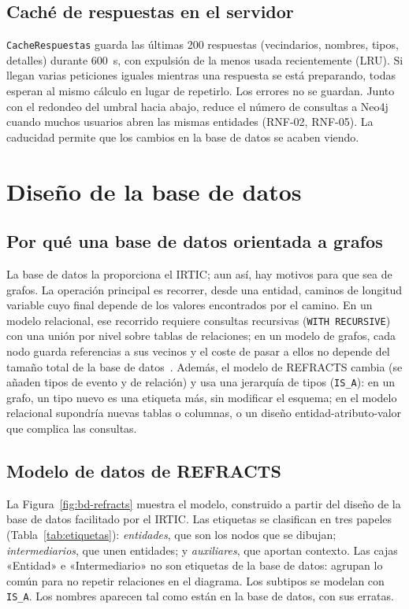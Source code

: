 \subsection{Caché de respuestas en el servidor}
\label{sec:alg-cache}

\texttt{CacheRespuestas} guarda las últimas 200 respuestas (vecindarios, nombres, tipos, detalles) durante 600~s, con expulsión de la menos usada recientemente (LRU). Si llegan varias peticiones iguales mientras una respuesta se está preparando, todas esperan al mismo cálculo en lugar de repetirlo. Los errores no se guardan. Junto con el redondeo del umbral hacia abajo, reduce el número de consultas a Neo4j cuando muchos usuarios abren las mismas entidades (RNF-02, RNF-05). La caducidad permite que los cambios en la base de datos se acaben viendo.

\section{Diseño de la base de datos}
\label{sec:bd}

\subsection{Por qué una base de datos orientada a grafos}

La base de datos la proporciona el IRTIC; aun así, hay motivos para que sea de grafos. La operación principal es recorrer, desde una entidad, caminos de longitud variable cuyo final depende de los valores encontrados por el camino. En un modelo relacional, ese recorrido requiere consultas recursivas (\texttt{WITH RECURSIVE}) con una unión por nivel sobre tablas de relaciones; en un modelo de grafos, cada nodo guarda referencias a sus vecinos y el coste de pasar a ellos no depende del tamaño total de la base de datos~\cite{robinson2015}. Además, el modelo de REFRACTS cambia (se añaden tipos de evento y de relación) y usa una jerarquía de tipos (\texttt{IS\_A}): en un grafo, un tipo nuevo es una etiqueta más, sin modificar el esquema; en el modelo relacional supondría nuevas tablas o columnas, o un diseño entidad-atributo-valor que complica las consultas.

\subsection{Modelo de datos de REFRACTS}

La Figura~\ref{fig:bd-refracts} muestra el modelo, construido a partir del diseño de la base de datos facilitado por el IRTIC. Las etiquetas se clasifican en tres papeles (Tabla~\ref{tab:etiquetas}): \emph{entidades}, que son los nodos que se dibujan; \emph{intermediarios}, que unen entidades; y \emph{auxiliares}, que aportan contexto. Las cajas «Entidad» e «Intermediario» no son etiquetas de la base de datos: agrupan lo común para no repetir relaciones en el diagrama. Los subtipos se modelan con \texttt{IS\_A}. Los nombres aparecen tal como están en la base de datos, con sus erratas.

